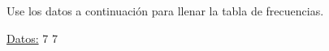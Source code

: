 \documentclass{cdplf-prueba}
\begin{document}
\subsection{}

Use los datos a continuación para llenar la tabla de frecuencias.

\underline{Datos:} \hspace{4pt} 7 \hspace{4pt}\textbullet\hspace{4pt} 7 \hs
\end{document}
